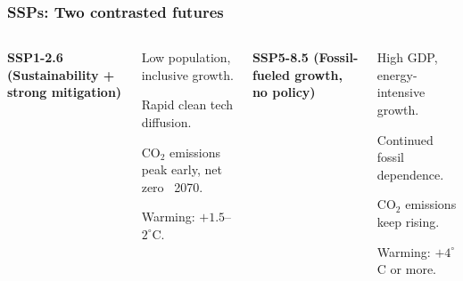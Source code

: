 \documentclass[xcolor=x11names,compress,aspectratio=169]{beamer}%
\makeatletter
\renewenvironment{itemize}{\begin{compactitemize}[<+-| alert@+>]}{\end{compactitemize}}
\makeatother
\begin{document}
\begin{frame}%
%

\frametitle{SSPs: Two contrasted futures}%
%

\begin{columns}%
%


\textcolor{ssp1}{\textbf{SSP1-2.6 (Sustainability + strong mitigation)}}

\begin{itemize}
\item Low population, inclusive growth.

\item Rapid clean tech diffusion.

\item CO$_{2}$ emissions peak early, net zero ~2070.

\item Warming: $+1.5$--$2^{\circ}$C.
\end{itemize}

%

%


\textcolor{ssp5}{\textbf{SSP5-8.5 (Fossil-fueled growth, no policy)}}

\begin{itemize}
\item High GDP, energy-intensive growth.

\item Continued fossil dependence.

\item CO$_{2}$ emissions keep rising.

\item Warming: $+4^{\circ}$C or more.
\end{itemize}

%

\end{columns}%
%

\transboxout
\end{frame}%
%
\end{document}
